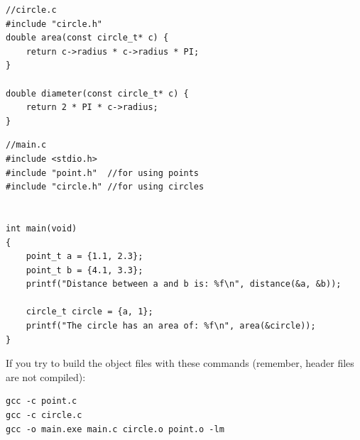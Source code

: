 \documentclass[a4paper]{article}
\begin{document}
\noindent
\begin{minipage}[H]{\linewidth}
\mbox{}
\begin{lstlisting}[style=C,
caption={Redefinition example -- \texttt{circle.c}},
label={lst:redefInclude}]
//circle.c
#include "circle.h"
double area(const circle_t* c) {
    return c->radius * c->radius * PI;
}

double diameter(const circle_t* c) {
    return 2 * PI * c->radius;
}
\end{lstlisting}
\end{minipage}

\noindent
\begin{minipage}[H]{\linewidth}
\mbox{}
\begin{lstlisting}[style=C,
caption={Redefinition example -- \texttt{main.c}},
label={lst:redefInclude}]
//main.c
#include <stdio.h>
#include "point.h"  //for using points
#include "circle.h" //for using circles


int main(void)
{
    point_t a = {1.1, 2.3};
    point_t b = {4.1, 3.3};
    printf("Distance between a and b is: %f\n", distance(&a, &b));

    circle_t circle = {a, 1};
    printf("The circle has an area of: %f\n", area(&circle));
}
\end{lstlisting}
\end{minipage}


If you try to build the object files with these commands (remember, header
files are not compiled):

\noindent
\begin{minipage}[H]{\linewidth}
\mbox{}
\begin{lstlisting}[style=terminalStyle]
gcc -c point.c
gcc -c circle.c
gcc -o main.exe main.c circle.o point.o -lm
\end{lstlisting}
\end{minipage}
\end{document}
